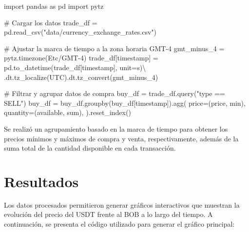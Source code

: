 \documentclass[
  letterpaper,
  DIV=11,
  numbers=noendperiod]{scrartcl}
\newenvironment{Shaded}{\begin{snugshade}}{\end{snugshade}}
\newcommand{\CommentTok}[1]{\textcolor[rgb]{0.37,0.37,0.37}{#1}}
\newcommand{\ImportTok}[1]{\textcolor[rgb]{0.00,0.46,0.62}{#1}}
\newcommand{\NormalTok}[1]{\textcolor[rgb]{0.00,0.23,0.31}{#1}}
\newcommand{\OperatorTok}[1]{\textcolor[rgb]{0.37,0.37,0.37}{#1}}
\newcommand{\StringTok}[1]{\textcolor[rgb]{0.13,0.47,0.30}{#1}}
\begin{document}
\begin{Shaded}
\begin{Highlighting}[]
\ImportTok{import}\NormalTok{ pandas }\ImportTok{as}\NormalTok{ pd}
\ImportTok{import}\NormalTok{ pytz}

\CommentTok{\# Cargar los datos}
\NormalTok{trade\_df }\OperatorTok{=}\NormalTok{ pd.read\_csv(}\StringTok{"data/currency\_exchange\_rates.csv"}\NormalTok{)}

\CommentTok{\# Ajustar la marca de tiempo a la zona horaria GMT{-}4}
\NormalTok{gmt\_minus\_4 }\OperatorTok{=}\NormalTok{ pytz.timezone(}\StringTok{\textquotesingle{}Etc/GMT{-}4\textquotesingle{}}\NormalTok{)}
\NormalTok{trade\_df[}\StringTok{\textquotesingle{}timestamp\textquotesingle{}}\NormalTok{] }\OperatorTok{=}\NormalTok{ pd.to\_datetime(trade\_df[}\StringTok{\textquotesingle{}timestamp\textquotesingle{}}\NormalTok{], unit}\OperatorTok{=}\StringTok{\textquotesingle{}s\textquotesingle{}}\NormalTok{)}\OperatorTok{\textbackslash{}}
\NormalTok{    .dt.tz\_localize(}\StringTok{\textquotesingle{}UTC\textquotesingle{}}\NormalTok{).dt.tz\_convert(gmt\_minus\_4)}

\CommentTok{\# Filtrar y agrupar datos de compra}
\NormalTok{buy\_df }\OperatorTok{=}\NormalTok{ trade\_df.query(}\StringTok{"type == \textquotesingle{}SELL\textquotesingle{}"}\NormalTok{)}
\NormalTok{buy\_df }\OperatorTok{=}\NormalTok{ buy\_df.groupby(buy\_df[}\StringTok{\textquotesingle{}timestamp\textquotesingle{}}\NormalTok{]).agg(}
\NormalTok{    price}\OperatorTok{=}\NormalTok{(}\StringTok{\textquotesingle{}price\textquotesingle{}}\NormalTok{, }\StringTok{\textquotesingle{}min\textquotesingle{}}\NormalTok{),}
\NormalTok{    quantity}\OperatorTok{=}\NormalTok{(}\StringTok{\textquotesingle{}available\textquotesingle{}}\NormalTok{, }\StringTok{\textquotesingle{}sum\textquotesingle{}}\NormalTok{),}
\NormalTok{).reset\_index()}
\end{Highlighting}
\end{Shaded}

Se realizó un agrupamiento basado en la marca de tiempo para obtener los
precios mínimos y máximos de compra y venta, respectivamente, además de
la suma total de la cantidad disponible en cada transacción.

\section{Resultados}\label{resultados}

Los datos procesados permitieron generar gráficos interactivos que
muestran la evolución del precio del USDT frente al BOB a lo largo del
tiempo. A continuación, se presenta el código utilizado para generar el
gráfico principal:
\end{document}
